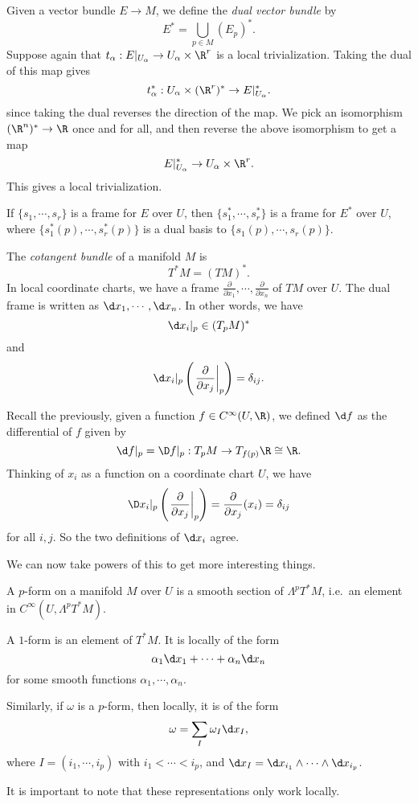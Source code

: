 \documentclass[a4paper]{article}
\begin{document}
\begin{defi}
  Given a vector bundle $E \to M$, we define the \emph{dual vector bundle} by
  \[
    E^* = \bigcup_{p \in M} (E_p)^*.
  \]
  Suppose again that $t_\alpha: E|_{U_\alpha} \to U_\alpha \times \R^r$ is a local trivialization. Taking the dual of this map gives
  \[
    t_\alpha^*: U_\alpha \times (\R^r)^* \to E|_{U_\alpha}^*.
  \]
  since taking the dual reverses the direction of the map. We pick an isomorphism $(\R^n)^* \to \R$ once and for all, and then reverse the above isomorphism to get a map
  \[
    E|_{U_\alpha}^* \to U_\alpha \times \R^r.
  \]
  This gives a local trivialization.
\end{defi}

If $\{s_1, \cdots, s_r\}$ is a frame for $E$ over $U$, then $\{s_1^*, \cdots, s_r^*\}$ is a frame for $E^*$ over $U$, where $\{s_1^{*}(p), \cdots, s_r^*(p)\}$ is a dual basis to $\{s_1(p), \cdots, s_r(p)\}$.

\begin{defi}
  The \emph{cotangent bundle} of a manifold $M$ is
  \[
    T^*M = (TM)^*.
  \]
  In local coordinate charts, we have a frame $\frac{\partial}{\partial x_1}, \cdots, \frac{\partial}{\partial x_n}$ of $TM$ over $U$. The dual frame is written as $\d x_1, \cdots, \d x_n$. In other words, we have
  \[
    \d x_i|_p \in (T_p M)^*
  \]
  and
  \[
    \d x_i|_p\left(\left.\frac{\partial}{\partial x_j}\right|_p\right) = \delta_{ij}.
  \]
\end{defi}

Recall the previously, given a function $f \in C^\infty(U, \R)$, we defined $\d f$ as the differential of $f$ given by
\[
  \d f|_p = \D f|_p: T_p M \to T_{f(p)} \R \cong \R.
\]
Thinking of $x_i$ as a function on a coordinate chart $U$, we have
\[
  \D x_i|_p \left(\left.\frac{\partial}{\partial x_j}\right|_p\right) = \frac{\partial}{\partial x_j}(x_i) = \delta_{ij}
\]
for all $i, j$. So the two definitions of $\d x_i$ agree.

We can now take powers of this to get more interesting things.
\begin{defi}[$p$-form]
  A $p$-form on a manifold $M$ over $U$ is a smooth section of $\Lambda^p T^*M$, i.e.\ an element in $C^\infty (U, \Lambda^p T^*M)$.
\end{defi}

\begin{eg}
  A $1$-form is an element of $T^* M$. It is locally of the form
  \[
    \alpha_1 \d x_1 + \cdots + \alpha_n \d x_n
  \]
  for some smooth functions $\alpha_1, \cdots, \alpha_n$.

  Similarly, if $\omega$ is a $p$-form, then locally, it is of the form
  \[
    \omega = \sum_I \omega_I \d x_I,
  \]
  where $I = (i_1, \cdots, i_p)$ with $i_1 < \cdots < i_p$, and $\d x_I = \d x_{i_1} \wedge \cdots \wedge \d x_{i_p}$.
\end{eg}
It is important to note that these representations only work locally.
\end{document}

